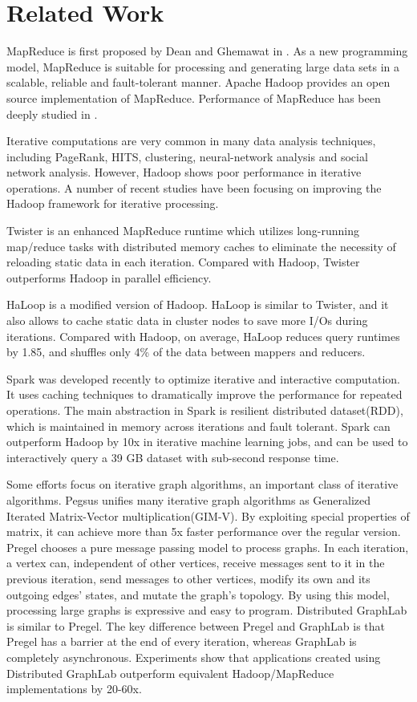 \documentclass[12pt,conference,letterpaper]{IEEEtran}
\begin{document}
\section{Related Work}
MapReduce is first proposed by Dean and Ghemawat in \cite{jdean2004}. As a new programming model, MapReduce is suitable for processing and generating large data sets in a scalable, reliable and fault-tolerant manner. Apache Hadoop\cite{url_hadoop} provides an open source implementation of MapReduce. Performance of MapReduce has been deeply studied in \cite{pavlo2009}\cite{jiang2010}\cite{lee2012}. 

Iterative computations are very common in many data analysis techniques, including PageRank\cite{page1999}, HITS\cite{kleinberg1999}, clustering, neural-network analysis and social network analysis. However, Hadoop shows poor performance in iterative operations. A number of recent studies have been focusing on improving the Hadoop framework for iterative processing. 

Twister\cite{jaliya2010} is an enhanced MapReduce runtime which utilizes long-running map/reduce tasks with distributed memory caches to eliminate the necessity of reloading static data in each iteration. Compared with Hadoop, Twister outperforms Hadoop in parallel efficiency. 

HaLoop\cite{yingyi2010} is a modified version of Hadoop. HaLoop is similar to Twister, and it also allows to cache static data in cluster nodes to save more I/Os during iterations. Compared with Hadoop, on average, HaLoop reduces query runtimes by 1.85, and shuffles only 4\% of the data between mappers and reducers.

Spark\cite{matei2010} was developed recently to optimize iterative and interactive computation. It uses caching techniques to dramatically improve the performance for repeated operations. The main abstraction in Spark is resilient distributed dataset(RDD), which is maintained in memory across iterations and fault tolerant. Spark can outperform Hadoop by 10x in iterative machine learning jobs, and can be used to interactively query a 39 GB dataset with sub-second response time.

Some efforts focus on iterative graph algorithms, an important class of iterative algorithms. Pegsus\cite{kang2009} unifies many iterative graph algorithms as Generalized Iterated Matrix-Vector multiplication(GIM-V). By exploiting special properties of matrix, it can achieve more than 5x faster performance over the regular version. Pregel\cite{malewicz2010} chooses a pure message passing model to process graphs. In each iteration, a vertex can, independent of other vertices, receive messages sent to it in the previous iteration, send messages to other vertices, modify its own and its outgoing edges' states, and mutate the graph's topology. By using this model, processing large graphs is expressive and easy to program. Distributed GraphLab\cite{low2012} is similar to Pregel. The key difference between Pregel and GraphLab is that Pregel has a barrier at the end of every iteration, whereas GraphLab is completely asynchronous. Experiments show that applications created using Distributed GraphLab outperform equivalent Hadoop/MapReduce implementations by 20-60x.
\end{document}
